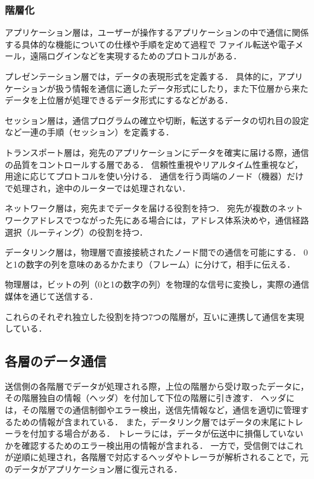 \documentclass[12pt,a4j,titlepage]{ltjsarticle}
\begin{document}
\subsubsection{階層化}
アプリケーション層は，ユーザーが操作するアプリケーションの中で通信に関係する具体的な機能についての仕様や手順を定めて過程で
ファイル転送や電子メール，遠隔ログインなどを実現するためのプロトコルがある．

プレゼンテーション層では，データの表現形式を定義する．
具体的に，アプリケーションが扱う情報を通信に適したデータ形式にしたり，また下位層から来たデータを上位層が処理できるデータ形式にするなどがある．

セッション層は，通信プログラムの確立や切断，転送するデータの切れ目の設定など一連の手順（セッション）を定義する．

トランスポート層は，宛先のアプリケーションにデータを確実に届ける際，通信の品質をコントロールする層である．
信頼性重視やリアルタイム性重視など，用途に応じてプロトコルを使い分ける．
通信を行う両端のノード（機器）だけで処理され，途中のルーターでは処理されない．

ネットワーク層は，宛先までデータを届ける役割を持つ．
宛先が複数のネットワークアドレスでつながった先にある場合には，アドレス体系決めや，通信経路選択（ルーティング）の役割を持つ．

データリンク層は，物理層で直接接続されたノード間での通信を可能にする．
0と1の数字の列を意味のあるかたまり（フレーム）に分けて，相手に伝える．

物理層は，ビットの列（0と1の数字の列）を物理的な信号に変換し，実際の通信媒体を通じて送信する．

これらのそれぞれ独立した役割を持つ7つの階層が，互いに連携して通信を実現している．

\subsection{各層のデータ通信}
送信側の各階層でデータが処理される際，上位の階層から受け取ったデータに，その階層独自の情報（ヘッダ）を付加して下位の階層に引き渡す．
ヘッダには，その階層での通信制御やエラー検出，送信先情報など，通信を適切に管理するための情報が含まれている．
また，データリンク層ではデータの末尾にトレーラを付加する場合がある．
トレーラには，データが伝送中に損傷していないかを確認するためのエラー検出用の情報が含まれる．
一方で，受信側ではこれが逆順に処理され，各階層で対応するヘッダやトレーラが解析されることで，元のデータがアプリケーション層に復元される．
\end{document}
